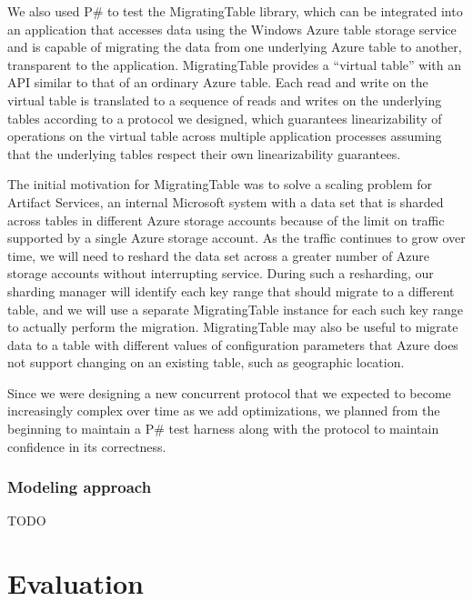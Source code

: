 \documentclass{sig-alternate}
\newcommand{\psharp}{P\#\xspace}
\begin{document}
We also used \psharp to test the MigratingTable library, which can be integrated into an application that accesses data using the Windows Azure table storage service and is capable of migrating the data from one underlying Azure table to another, transparent to the application.  MigratingTable provides a ``virtual table'' with an API similar to that of an ordinary Azure table.  Each read and write on the virtual table is translated to a sequence of reads and writes on the underlying tables according to a protocol we designed, which guarantees linearizability of operations on the virtual table across multiple application processes assuming that the underlying tables respect their own linearizability guarantees.

The initial motivation for MigratingTable was to solve a scaling problem for Artifact Services, an internal Microsoft system with a data set that is sharded across tables in different Azure storage accounts because of the limit on traffic supported by a single Azure storage account.  As the traffic continues to grow over time, we will need to reshard the data set across a greater number of Azure storage accounts without interrupting service.  During such a resharding, our sharding manager will identify each key range that should migrate to a different table, and we will use a separate MigratingTable instance for each such key range to actually perform the migration.  MigratingTable may also be useful to migrate data to a table with different values of configuration parameters that Azure does not support changing on an existing table, such as geographic location.

Since we were designing a new concurrent protocol that we expected to become increasingly complex over time as we add optimizations, we planned from the beginning to maintain a \psharp test harness along with the protocol to maintain confidence in its correctness.

\subsubsection{Modeling approach}

TODO

\section{Evaluation}
\label{sec:eval}
\end{document}
